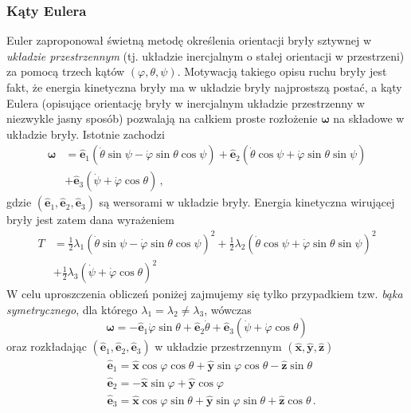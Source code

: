 \documentclass[../main.tex]{subfiles}
\begin{document}
\subsubsection{Kąty Eulera}
Euler zaproponował świetną metodę określenia orientacji bryły sztywnej w \textit{układzie przestrzennym} (tj. układzie inercjalnym o stałej orientacji w przestrzeni) za pomocą trzech kątów \((\varphi, \theta,\psi )\). Motywacją takiego opisu ruchu bryły jest fakt, że energia kinetyczna bryły ma w układzie bryły najprostszą postać, a kąty Eulera (opisujące orientację bryły w inercjalnym układzie przestrzenny w niezwykle jasny sposób) pozwalają na całkiem proste rozłożenie \(\boldsymbol{\omega}\) na składowe w układzie bryły. Istotnie zachodzi
\begin{equation*}
\begin{split}
    \boldsymbol{\omega}&=\mathbf{\hat e}_1(\dot\theta \sin\psi-\dot\varphi\sin\theta\cos\psi)+\mathbf{\hat e}_2(\dot\theta\cos\psi+\dot\varphi\sin\theta\sin\psi)\\
    &+\mathbf{\hat e}_3(\dot\psi+\dot\varphi\cos\theta)\,,
\end{split}
\end{equation*}
gdzie \((\mathbf{\hat e}_1,\mathbf{\hat e}_2,\mathbf{\hat e}_3)\) są wersorami w układzie bryły. 
Energia kinetyczna wirującej bryły jest zatem dana wyrażeniem
\begin{equation*}
\begin{split}
    T&=\frac{1}{2}\lambda_1(\dot\theta \sin\psi-\dot\varphi\sin\theta\cos\psi)^2+\frac{1}{2}\lambda_2(\dot\theta\cos\psi+\dot\varphi\sin\theta\sin\psi)^2\\
    &+\frac{1}{2}\lambda_3(\dot\psi+\dot\varphi\cos\theta)^2
\end{split}
\end{equation*}
W celu uproszczenia obliczeń poniżej zajmujemy się tylko przypadkiem tzw. \textit{bąka symetrycznego}, dla którego \(\lambda_1=\lambda_2\neq\lambda_3\), wówczas 
\begin{equation*}
    \boldsymbol{\omega}=-\mathbf{\hat{e}}_1\dot\varphi\sin\theta+\mathbf{\hat{e}}_2\dot\theta+\mathbf{\hat{e}}_3(\dot\psi+\dot\varphi\cos\theta)
\end{equation*}
oraz rozkładając \((\mathbf{\hat e}_1,\mathbf{\hat e}_2,\mathbf{\hat e}_3)\) w układzie przestrzennym \((\mathbf{\hat{x}},\mathbf{\hat{y}},\mathbf{\hat{z}})\)
\begin{equation*}
    \begin{split}
        &\mathbf{\hat{e}}_1=\mathbf{\hat{x}}\cos\varphi\cos\theta+\mathbf{\hat{y}}\sin\varphi\cos\theta-\mathbf{\hat{z}}\sin\theta\\
        &\mathbf{\hat{e}}_2=-\mathbf{\hat{x}}\sin\varphi+\mathbf{\hat{y}}\cos\varphi\\
        &\mathbf{\hat{e}}_3=\mathbf{\hat{x}}\cos\varphi\sin\theta+\mathbf{\hat{y}}\sin\varphi\sin\theta+\mathbf{\hat{z}}\cos\theta\,.
    \end{split}
\end{equation*}
\end{document}

